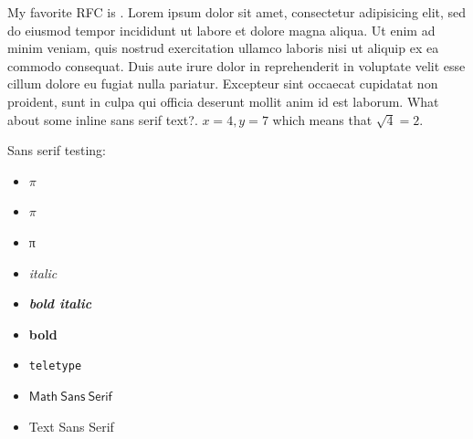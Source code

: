 
My favorite RFC is \cite{rfc2549}.
Lorem ipsum dolor sit amet, consectetur adipisicing elit, sed do eiusmod tempor incididunt ut labore et dolore magna aliqua. Ut enim ad minim veniam, quis nostrud exercitation ullamco laboris nisi ut aliquip ex ea commodo consequat. Duis aute irure dolor in reprehenderit in voluptate velit esse cillum dolore eu fugiat nulla pariatur. Excepteur sint occaecat cupidatat non proident, sunt in culpa qui officia deserunt mollit anim id est laborum. \textsf{What about some inline sans serif text?}. $x = 4, y= 7$ which means that $\sqrt{4} = 2$.

Sans serif testing:
\begin{itemize}
    \item \textsf{$\pi$}
    \item \textsf{$π$}
    \item \textsf{π}
    \item \textsf{\emph{italic}}
    \item \textsf{\textbf{\emph{bold italic}}}
    \item \textsf{\textbf{bold}}
    \item \textsf{\texttt{teletype}}
    \item $\mathsf{Math\ Sans\ Serif}$
    \item \textsf{Text Sans Serif}
\end{itemize}

